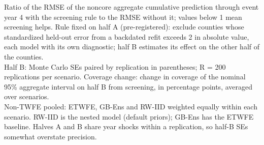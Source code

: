 \begin{table}
\begin{tabular*}{1\linewidth}{@{\extracolsep{\fill}}lrrrrrrr}
\bottomrule
\end{tabular*}
\begin{minipage}{\linewidth}
\vspace{.05em}
Ratio of the RMSE of the noncore aggregate cumulative prediction through event year 4 with the screening rule to the RMSE without it; values below 1 mean screening helps. Rule fixed on half A (pre-registered): exclude counties whose standardized held-out error from a backdated refit exceeds 2 in absolute value, each model with its own diagnostic; half B estimates its effect on the other half of the counties.\\
Half B: Monte Carlo SEs paired by replication in parentheses; R = 200 replications per scenario. Coverage change: change in coverage of the nominal 95\% aggregate interval on half B from screening, in percentage points, averaged over scenarios.\\
Non-TWFE pooled: ETWFE, GB-Ens and RW-IID weighted equally within each scenario. RW-IID is the nested model (default priors); GB-Ens has the ETWFE baseline. Halves A and B share year shocks within a replication, so half-B SEs somewhat overstate precision.\\
\end{minipage}
\end{table}

